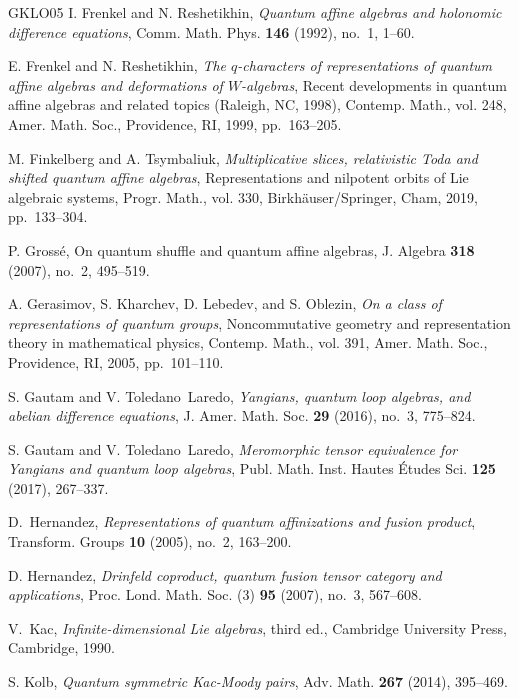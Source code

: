 \documentclass[reqno]{amsart}
\numberwithin{equation}{section}
\begin{document}
\begin{thebibliography}{GKLO05}
I. Frenkel and N. Reshetikhin, \emph{Quantum affine algebras and
	holonomic difference equations}, Comm. Math. Phys. \textbf{146} (1992),
no.~1, 1--60.

E. Frenkel and N. Reshetikhin, \emph{The {$q$}-characters of
	representations of quantum affine algebras and deformations of
	{$W$}-algebras}, Recent developments in quantum affine algebras and related
topics ({R}aleigh, {NC}, 1998), Contemp. Math., vol. 248, Amer. Math. Soc.,
Providence, RI, 1999, pp.~163--205. 

M. Finkelberg and A. Tsymbaliuk, \emph{Multiplicative slices,
	relativistic {T}oda and shifted quantum affine algebras}, Representations and
nilpotent orbits of {L}ie algebraic systems, Progr. Math., vol. 330,
Birkh\"auser/Springer, Cham, 2019, pp.~133--304. 

 P. Gross\'e, On quantum shuffle and quantum affine algebras, J. Algebra {\bf 318} (2007), no.~2, 495--519. 

A. Gerasimov, S. Kharchev, D. Lebedev, and S. Oblezin, \emph{On
	a class of representations of quantum groups}, Noncommutative geometry and
representation theory in mathematical physics, Contemp. Math., vol. 391,
Amer. Math. Soc., Providence, RI, 2005, pp.~101--110. 

S. Gautam and V. Toledano~Laredo, \emph{Yangians, quantum loop
	algebras, and abelian difference equations}, J. Amer. Math. Soc. \textbf{29}
(2016), no.~3, 775--824. 

S. Gautam and V. Toledano~Laredo, \emph{Meromorphic tensor equivalence for {Y}angians and quantum loop
	algebras}, Publ. Math. Inst. Hautes \'Etudes Sci. \textbf{125} (2017),
267--337. 

D.~Hernandez, \emph{Representations of quantum affinizations and fusion
	product}, Transform. Groups \textbf{10} (2005), no.~2, 163--200. 

D. Hernandez, \emph{Drinfeld coproduct, quantum fusion tensor category and
	applications}, Proc. Lond. Math. Soc. (3) \textbf{95} (2007), no.~3,
567--608. 

V.~Kac, \emph{Infinite-dimensional {L}ie algebras}, third ed., Cambridge
University Press, Cambridge, 1990.

S. Kolb, \emph{Quantum symmetric {K}ac-{M}oody pairs}, Adv. Math.
\textbf{267} (2014), 395--469. 


\end{thebibliography}
\end{document}
